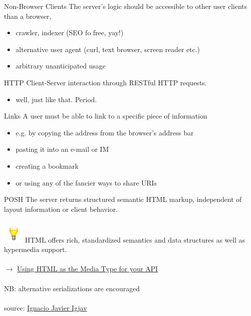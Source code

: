 \documentclass{beamer}
\begin{document}
\begin{frame}{Non-Browser Clients}
  The server's logic should be accessible to other user clients than a browser,

  \begin{itemize}
    \item crawler, indexer (SEO fo free, yay!)
    \item alternative user agent (curl, text browser, screen reader etc.)
    \item arbitrary unanticipated usage
  \end{itemize}
\end{frame}

\begin{frame}{HTTP}
  Client-Server interaction through RESTful HTTP requests.

  \begin{itemize}
    \item well, just like that. Period.
  \end{itemize}
\end{frame}

\begin{frame}{Links}
  A user must be able to link to a specific piece of information

  \begin{itemize}
    \item e.g. by copying the address from the browser's address bar
    \item pasting it into an e-mail or IM
    \item creating a bookmark
    \item or using any of the fancier ways to share URIs
  \end{itemize}
\end{frame}

\begin{frame}{POSH}
  The server returns structured semantic HTML markup, independent of layout information or client behavior.
  \\~\\

  \includegraphics[width=1cm]{images/bulb.png}
  HTML offers rich, standardized semantics and data structures as well as hypermedia support.
  \\~\\

  \ensuremath{\rightarrow}
  \href{http://codeartisan.blogspot.de/2012/07/using-html-as-media-type-for-your-api.html}{Using HTML as the Media Type for your API}
  \\~\\

  NB: alternative serializations are encouraged
  \\~\\

  \tiny source: \href{http://commons.wikimedia.org/wiki/File:Bombilla_amarilla_-_yellow_Edison_lamp.svg}{Ignacio Javier Igjav}
\end{frame}
\end{document}
